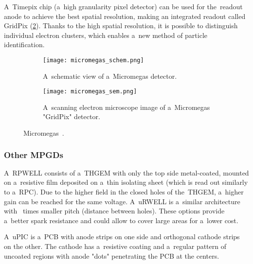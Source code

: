 				A~Timepix chip (a~high granularity pixel detector) can be used for the~readout anode to achieve the best spatial resolution, making an integrated readout called GridPix (\cref{fig:micromegas_sem}). Thanks to the high spatial resolution, it is possible to distinguish individual electron clusters, which enables a~new method of particle identification.
				
				\begin{figure}
					\centering
					\begin{subfigure}[t]{0.54\textwidth}
						\centering
						\texttt{[image: micromegas\_schem.png]}
						\caption{A~schematic view of a~\ac{Micromegas} detector.}
						\label{fig:micromegas_schem}
					\end{subfigure}
					\hfill
					\begin{subfigure}[t]{0.44\textwidth}
						\centering
						\texttt{[image: micromegas\_sem.png]}
						\caption{A~scanning electron microscope image of a~\ac{Micromegas} "GridPix" detector.}
						\label{fig:micromegas_sem}
					\end{subfigure}
					\caption{\acf{Micromegas}~\cite{pdg2024}.}
					\label{fig:micromegas}
				\end{figure}
			
			\subsubsection{Other \acp{MPGD}}
				A~\ac{RPWELL} consists of a~\ac{THGEM} with only the top side metal-coated, mounted on a~resistive film deposited on a~thin isolating sheet (which is read out similarly to a~\ac{RPC}). Due to the higher field in the closed holes of the~\ac{THGEM}, a~higher gain can be reached for the same voltage. A~\ac{uRWELL} is a~similar architecture with ~times smaller pitch (distance between holes). These options provide a~better spark resistance and could allow to cover large areas for a~lower cost.
				
				A~\ac{uPIC} is a~\ac{PCB} with anode strips on one side and orthogonal cathode strips on the other. The cathode has a~resistive coating and a~regular pattern of uncoated regions with anode "dots" penetrating the \ac{PCB} at the centers.
	
